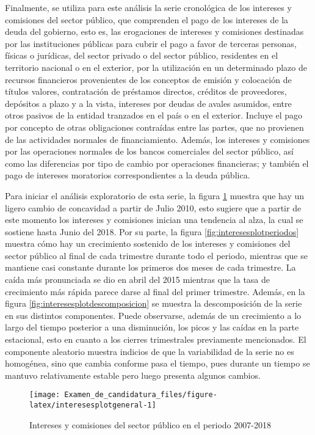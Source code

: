 \documentclass[
]{article}
\begin{document}
Finalmente, se utiliza para este análisis la serie cronológica de los
intereses y comisiones del sector público, que comprenden el pago de los
intereses de la deuda del gobierno, esto es, las erogaciones de
intereses y comisiones destinadas por las instituciones públicas para
cubrir el pago a favor de terceras personas, físicas o jurídicas, del
sector privado o del sector público, residentes en el territorio
nacional o en el exterior, por la utilización en un determinado plazo de
recursos financieros provenientes de los conceptos de emisión y
colocación de títulos valores, contratación de préstamos directos,
créditos de proveedores, depósitos a plazo y a la vista, intereses por
deudas de avales asumidos, entre otros pasivos de la entidad tranzados
en el país o en el exterior. Incluye el pago por concepto de otras
obligaciones contraídas entre las partes, que no provienen de las
actividades normales de financiamiento. Además, los intereses y
comisiones por las operaciones normales de los bancos comerciales del
sector público, así como las diferencias por tipo de cambio por
operaciones financieras; y también el pago de intereses moratorios
correspondientes a la deuda pública.

Para iniciar el análisis exploratorio de esta serie, la figura
\ref{fig:interesesplotgeneral} muestra que hay un ligero cambio de
concavidad a partir de Julio 2010, esto sugiere que a partir de este
momento los intereses y comisiones inician una tendencia al alza, la
cual se sostiene hasta Junio del 2018. Por su parte, la figura
\ref{fig:interesesplotperiodos} muestra cómo hay un crecimiento
sostenido de los intereses y comisiones del sector público al final de
cada trimestre durante todo el periodo, mientras que se mantiene casi
constante durante los primeros dos meses de cada trimestre. La caída más
pronunciada se dio en abril del 2015 mientras que la tasa de crecimiento
más rápida parece darse al final del primer trimestre. Además, en la
figura \ref{fig:interesesplotdescomposicion} se muestra la
descomposición de la serie en sus distintos componentes. Puede
observarse, además de un crecimiento a lo largo del tiempo posterior a
una disminución, los picos y las caídas en la parte estacional, esto en
cuanto a los cierres trimestrales previamente mencionados. El componente
aleatorio muestra indicios de que la variabilidad de la serie no es
homogénea, sino que cambia conforme pasa el tiempo, pues durante un
tiempo se mantuvo relativamente estable pero luego presenta algunos
cambios.

\begin{figure}[H]
\texttt{[image: Examen\_de\_candidatura\_files/figure-latex/interesesplotgeneral-1]} \caption{Intereses y comisiones del sector público en el periodo 2007-2018}\label{fig:interesesplotgeneral}
\end{figure}
\end{document}
